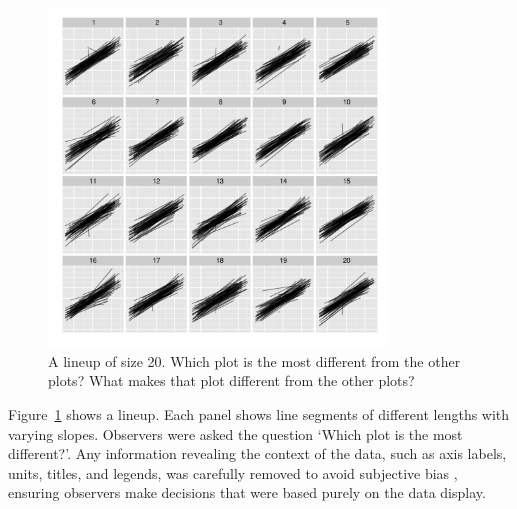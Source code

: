 \documentclass[12pt]{article} %
\newcommand{\hh}[1]{{\color{orange} #1}}
\newcommand{\al}[1]{{\color{ForestGreen} #1}}
\newcommand{\alnote}[1]{\todo[inline,color=green!40]{#1}} %
\newcommand{\hhnote}[1]{\todo[inline,color=orange!40]{#1}}
\begin{document}
\begin{figure}
	\centering
	\includegraphics[width=0.8\textwidth]{normexam_fanned_lineup16.pdf}
	\caption{\label{fig:fanned} A lineup of size 20. Which plot is the most different from the other plots? What makes that plot different from the other plots?
	}
\end{figure}

Figure~\ref{fig:fanned} shows a lineup. Each panel shows  line segments of different lengths  with varying slopes. Observers were asked the question `Which plot is the most different?'.    Any  information revealing the context of the data, such as axis labels, units, titles, and legends,  was carefully removed to  avoid subjective bias \citep{meilgaard}, ensuring observers make decisions that were based purely on the data display. 
\end{document}
